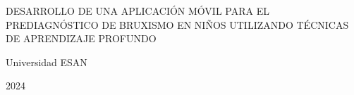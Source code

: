 \begin{center}
	{DESARROLLO DE UNA APLICACIÓN MÓVIL PARA EL PREDIAGNÓSTICO DE BRUXISMO EN NIÑOS UTILIZANDO TÉCNICAS DE APRENDIZAJE PROFUNDO}
\end{center}

\vspace{3cm}

\rightline{\fillin[9cm]}
\vspace{3cm}

\rightline{\fillin[9cm]}
\vspace{3cm}

\rightline{\fillin[9cm]}
\vspace{3cm}

\centerline{Universidad ESAN}
\centerline{2024}